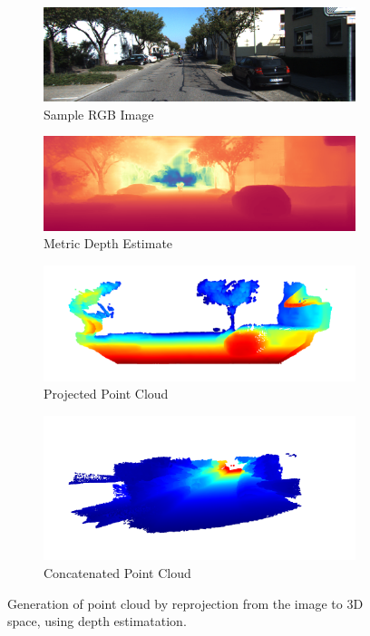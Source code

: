 \begin{figure}[t]
    \centering
    \begin{subfigure}[t]{0.49\textwidth}
        \centering
        \includegraphics[width=\textwidth]{figures/rgb_image.png}
        \caption{Sample RGB Image}
    \end{subfigure}
    \begin{subfigure}[t]{0.49\textwidth}
        \centering
        \includegraphics[width=\textwidth]{figures/depth_estimate.png}
        \caption{Metric Depth Estimate}
    \end{subfigure}
    \begin{subfigure}[t]{0.49\textwidth}
        \centering
        \includegraphics[width=\textwidth]{figures/projected_point_cloud.png}
        \caption{Projected Point Cloud}
    \end{subfigure}
    \begin{subfigure}[t]{0.49\textwidth}
        \centering
        \includegraphics[width=\textwidth]{figures/concatenated_point_cloud.png}
        \caption{Concatenated Point Cloud}
    \end{subfigure}
    \caption{Generation of point cloud by reprojection from the image to 3D space, using depth estimatation.}
    \label{fig:image_to_3d_projection}
\end{figure}

